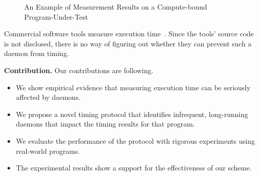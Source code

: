 \documentclass[letter]{ieice}
\begin{document}
\begin{figure}[t]
	\centering
	\caption{{\color{blue}An Example of Measurement Results on a \linebreak \hbox{Compute-bound}} 
	Program-Under-Test~\label{fig:meas_comp}}
	\vspace{-.18in}
\end{figure} 

Commercial software tools measure execution time~\cite{VTune,TimeSys,WindView}. 
Since the tools' source code is not disclosed, there is no way of figuring out 
whether they can prevent such a daemon from timing. 

\vspace{0.05in}
{\bf Contribution.} 
Our contributions are following.
\vspace{-0.05in}
\begin{itemize}

\item We show empirical evidence that 
measuring execution time 
can be seriously affected by daemons.

\item We propose a novel timing protocol that
identifies infrequent, long-running daemons that impact the timing results for that program. 

\item {\color{blue}We evaluate the performance of the protocol with rigorous experiments 
using real-world programs.}

\item The experimental results show a support for the effectiveness of our scheme. 

\end{itemize}
\vspace{-0.05in}
\end{document}

